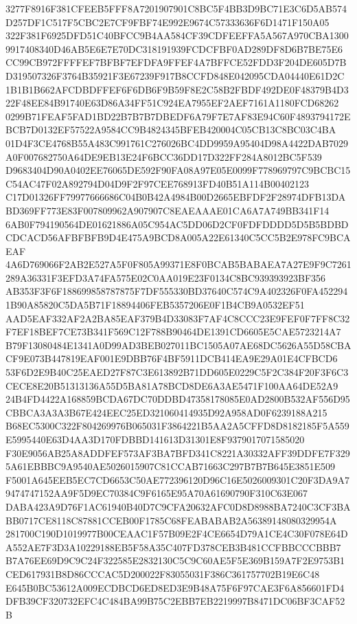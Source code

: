 \documentclass[UTF8,fontset=fandol,zihao=-4,a4paper]{ctexart}
\begin{document}
{{3277F8916F381CFEEB5FFF8A7201907901C8BC5F4BB3D9BC71E3C6D5AB574D257DF1C517F5CBC2E7CF9FBF74E992E9674C57333636F6D1471F150A05
322F381F6925DFD51C40BFCC9B4AA584CF39CDFEEFFA5A567A970CBA13009917408340D46AB5E6E7E70DC318191939FCDCFBF0AD289DF8D6B7BE75E6
CC99CB972FFFFEF7BFBF7EFDFA9FFEF4A7BFFCE52FDD3F204DE605D7BD319507326F3764B35921F3E67239F917B8CCFD848E042095CDA04440E61D2C
1B1B1B662AFCDBDFFEF6F6DB6F9B59F8E2C58B2FBDF492DE0F48379B4D322F48EE84B91740E63D86A34FF51C924EA7955EF2AEF7161A1180FCD68262
0299B71FEAF5FAD1BD22B7B7B7DBEDF6A79F7E7AF83E94C60F4893794172EBCB7D0132EF57522A9584CC9B4824345BFEB420004C05CB13C8BC03C4BA
01D4F3CE4768B55A483C991761C276026BC4DD9959A95404D98A4422DAB7029A0F007682750A64DE9EB13E24F6BCC36DD17D322FF284A8012BC5F539
D9683404D90A0402EE76065DE592F90FA08A97E05E0099F778969797C9BCBC15C54AC47F02A892794D04D9F2F97CEE768913FD40B51A114B00402123
C17D01326FF79977666686C04B0B42A4984B00D2665EBFDF2F28974DFB13DABD369FF773E83F007809962A907907C8EAEAAAE01CA6A7A749BB341F14
6AB0F794190564DE01621886A05C954AC5DD06D2CF0FDFDDDD5D5B5BDBDCDCACD56AFBFBFB9D4E475A9BCD8A005A22E61340C5CC5B2E978FC9BCAEAF
4A6D769066F2AB2E527A5F0F805A99371E8F0BCAB5BABAEA7A27E9F9C7261289A36331F3EFD3A74FA575E02C0AA019E23F0134C8BC939393923BF356
AB353F3F6F188699858787875F7DF555330BD37640C574C9A402326F0FA4522941B90A85820C5DA5B71F18894406FEB5357206E0F1B4CB9A0532EF51
AAD5EAF332AF2A2BA85EAF379B4D33083F7AF4C8CCC23E9FEF0F7FF8C32F7EF18BEF7CE73B341F569C12F788B90464DE1391CD6605E5CAE5723214A7
B79F13080484E1341A0D99AD3BEB027011BC1505A07AE68DC5626A55D58CBACF9E073B447819EAF001E9DBB76F4BF5911DCB414EA9E29A01E4CFBCD6
53F6D2E9B40C25EAED27F87C3E613892B71DD605E0229C5F2C384F20F3F6C3CECE8E20B51313136A55D5BA81A78BCD8DE6A3AE5471F100AA64DE52A9
24B4FD4422A168859BCDA67DC70DDBD47358178085E0AD2800B532AF556D95CBBCA3A3A3B67E424EEC25ED321060414935D92A958AD0F6239188A215
B68EC5300C322F804269976B065031F3864221B5AA2A5CFFD8D8182185F5A559E5995440E63D4AA3D170FDBBD141613D31301E8F9379017071585020
F30E9056AB25A8ADDFEF573AF3BA7BFD341C8221A30332AFF39DDFE7F3295A61EBBBC9A9540AE5026015907C81CCAB71663C297B7B7B645E3851E509
F5001A645EEB5EC7CD6653C50AE772396120D96C16E5026009301C20F3DA9A79474747152AA9F5D9EC70384C9F6165E95A70A61690790F310C63E067
DABA423A9D76F1AC61940B40D7C9CFA20632AFC0D8D8988BA7240C3CF3BABB0717CE8118C87881CCEB00F1785C68FEABABAB2A56389148080329954A
281700C190D1019977B00CEAAC1F57B09E2F4CE6654D79A1CE4C30F078E64DA552AE7F3D3A10229188EB5F58A35C407FD378CEB3B481CCFBBCCCBBB7
B7A76EE69D9C9C24F322585E2832130C5C9C60AE5F5E369B159A7F2E9753B1CED617931B8D86CCCAC5D200022F83055031F386C361757702B19E6C48
E645B0BC53612A009ECDBCD6ED8ED3E9B48A75F6F97CAE3F6A856601FD4DFB39CF320732EFC4C484BA99B75C2EBB7EB2219997B8471DC06BF3CAF52B
}}
\end{document}
